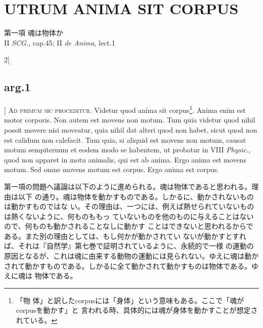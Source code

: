 \documentclass[paper=a4paper,fontsize=10pt,jafontsize=9pt,titlepage]{jlreq}
\begin{document}
\section{UTRUM ANIMA SIT CORPUS}
{\Large 第一項 魂は物体か}\\
{\footnotesize II {\itshape SCG.}, cap.45; II {\itshape de Anima}, lect.1}\\
\vspace{2em}
\begin{paracol}{2}[\subsection{arg.1}]
{\scshape Ad primum sic proceditur}. Videtur quod anima sit corpus\footnote{「物
 体」と訳したcorpusには「身体」という意味もある。ここで「魂がcorpusを動かす」と
 言われる時、具体的には魂が身体を動かすことが想定されている。}. Anima enim est
 motor corporis. Non autem est movens non motum. Tum quia videtur quod nihil
 possit movere nisi moveatur, quia nihil dat alteri quod non habet, sicut quod
 non est calidum non calefacit. Tum quia, si aliquid est movens non motum,
 causat motum sempiternum et eodem modo se habentem, ut probatur in VIII
 {\itshape Physic}., quod non apparet in motu animalis, qui est ab anima. Ergo
 anima est movens motum. Sed omne movens motum est corpus. Ergo anima est
 corpus.

\switchcolumn

第一項の問題へ議論は以下のように進められる。魂は物体であると思われる。理由は以下
の通り。魂は物体を動かすものである。しかるに、動かされないものは動かすものではな
い。その理由は、一つには、例えば熱せられていないものは熱くないように、何ものももっ
ていないものを他のものに与えることはないので、何ものも動かされることなしに動かす
ことはできないと思われるからである。また別の理由としては、もし何かが動かされてい
ないが動かすとすれば、それは『自然学』第七巻で証明されているように、永続的で一様
の運動の原因となるが、これは魂に由来する動物の運動には見られない。ゆえに魂は動か
されて動かすものである。しかるに全て動かされて動かすものは物体である。ゆえに魂は
物体である。




\end{paracol}
\end{document}
